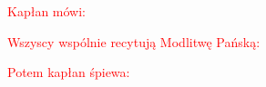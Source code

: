 \begin{Parallel}[v]{0.485\textwidth}{0.485\textwidth}
\end{Parallel}

\begin{center}
\textcolor{red}{Kapłan mówi:}
\end{center}

\begin{Parallel}[v]{0.485\textwidth}{0.485\textwidth}
\end{Parallel}

\begin{center}
\textcolor{red}{Wszyscy wspólnie recytują Modlitwę Pańską:}
\end{center}

\begin{Parallel}[v]{0.485\textwidth}{0.485\textwidth}
\end{Parallel}

\begin{center}
\textcolor{red}{Potem kapłan śpiewa:}
\end{center}

